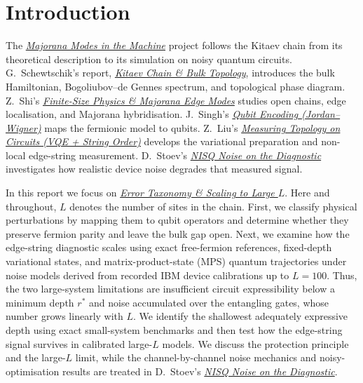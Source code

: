 \section{Introduction}
\label{sec:intro}

The \href{https://github.com/edhar98/majorana-modes-machine}{\emph{Majorana Modes in the Machine}} project follows the Kitaev chain from
its theoretical description to its simulation on noisy quantum circuits.
G.~Schewtschik's report, \href{https://edhar98.github.io/majorana-modes-machine/reports/Guilherme_Schewtschik/report.pdf}{\emph{Kitaev Chain \& Bulk Topology}}, introduces
the bulk Hamiltonian, Bogoliubov--de Gennes spectrum, and topological phase
diagram. Z.~Shi's \href{https://edhar98.github.io/majorana-modes-machine/reports/Zhenming_Shi/report.pdf}{\emph{Finite-Size Physics \& Majorana Edge Modes}} studies
open chains, edge localisation, and Majorana hybridisation. J.~Singh's
\href{https://edhar98.github.io/majorana-modes-machine/reports/Jaskaran_Singh/report.pdf}{\emph{Qubit Encoding (Jordan--Wigner)}} maps the fermionic model to qubits.
Z.~Liu's \href{https://edhar98.github.io/majorana-modes-machine/reports/Zhengyi_Liu/report.pdf}{\emph{Measuring Topology on Circuits (VQE + String Order)}} develops
the variational preparation and non-local edge-string measurement.
D.~Stoev's \href{https://edhar98.github.io/majorana-modes-machine/reports/Dobromir_Stoev/report.pdf}{\emph{NISQ Noise on the Diagnostic}} investigates how realistic device
noise degrades that measured signal.

In this report we focus on \href{https://edhar98.github.io/majorana-modes-machine/reports/Edgar_Harutyunyan/report.pdf}{\emph{Error Taxonomy \& Scaling to Large $L$}}. 
Here and throughout, $L$ denotes the number of sites in the chain.
First, we classify physical perturbations by mapping them to qubit operators
and determine whether they preserve fermion parity and leave the bulk gap open.
Next, we examine how the edge-string diagnostic scales using exact free-fermion references,
fixed-depth variational states, and matrix-product-state (MPS) quantum trajectories under
noise models derived from recorded IBM device calibrations up to $L=100$.
Thus, the two large-system limitations are insufficient circuit expressibility 
below a minimum depth $r^\ast$ and noise accumulated over the entangling gates,
whose number grows linearly with $L$. We identify the shallowest adequately expressive depth 
using exact small-system benchmarks and then test how the edge-string signal survives in calibrated large-$L$ models.
We discuss the protection principle and the large-$L$ limit,
while the channel-by-channel noise mechanics and noisy-optimisation
results are treated in D.~Stoev's \href{https://edhar98.github.io/majorana-modes-machine/reports/Dobromir_Stoev/report.pdf}{\emph{NISQ Noise on the Diagnostic}}.
